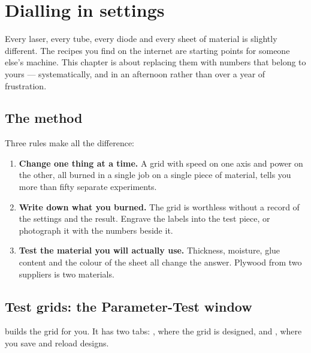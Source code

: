 \chapter{Dialling in settings}
\label{ch:tuning}

Every laser, every tube, every diode and every sheet of material is slightly
different. The recipes you find on the internet are starting points for someone
else's machine. This chapter is about replacing them with numbers that belong to
yours --- systematically, and in an afternoon rather than over a year of
frustration.

\section{The method}

Three rules make all the difference:

\begin{enumerate}[leftmargin=1.6em]
  \item \textbf{Change one thing at a time.} A grid with speed on one axis and
        power on the other, all burned in a single job on a single piece of
        material, tells you more than fifty separate experiments.
  \item \textbf{Write down what you burned.} The grid is worthless without a
        record of the settings and the result. Engrave the labels into the test
        piece, or photograph it with the numbers beside it.
  \item \textbf{Test the material you will actually use.} Thickness, moisture,
        glue content and the colour of the sheet all change the answer. Plywood
        from two suppliers is two materials.
\end{enumerate}

\section{Test grids: the Parameter-Test window}

 builds the grid for you. It has two tabs:
, where the grid is designed, and , where
you save and reload designs.

